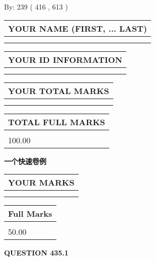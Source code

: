 \documentclass{ctexart}
\begin{document}
   
\hspace{1.0in} By: 
 239 ( 416 ,  613 )
   
   
   
   
\newpage 
\setcounter{page}{ 
   435001 } 
   
   
   
   
\noindent\begin{tabular}{|l|}
\hline
YOUR NAME (FIRST, ... LAST)  \\
\hline
 \\ 
 \\ 
\hline
\end{tabular}
\hspace{0.05in} \begin{tabular}{|l|}
\hline
 YOUR   ID   INFORMATION  \\
\hline
 \\ 
 \\ 
\hline
\end{tabular}
   
   
\vspace{0.2in}\noindent\begin{tabular}{|l|}
\hline
YOUR TOTAL MARKS  \\
\hline
 \\ 
 \\ 
\hline
\end{tabular}
\hspace{0.05in} \begin{tabular}{|l|}
\hline
TOTAL FULL MARKS  \\
\hline
 \\ 
100.00 \\
\hline
\end{tabular}
   
   
 \vspace{0.2in}
{\LARGE {\textbf{ 一个快速卷例}}}
   
   
  
\vspace{0.2in}
  
\noindent\begin{tabular}{|l|}
\hline
 YOUR MARKS  \\
\hline
 \\ 
 \\ 
\hline
\end{tabular}
\hspace{0.05in} \begin{tabular}{|l|}
\hline
 Full Marks  \\
\hline
 \\ 
50.00 \\
\hline
\end{tabular}
{\textbf{\Large{QUESTION
435.1 
}}}
  
\end{document}
